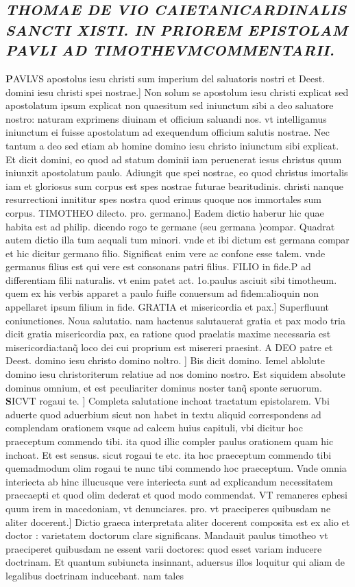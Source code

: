 \documentclass{article}
\begin{document}
\begin{pages}
\subsection*{\textit{THOMAE DE VIO CAIETANICARDINALIS SANCTI XISTI. IN PRIOREM EPISTOLAM PAVLI AD TIMOTHEVMCOMMENTARII. }}\pstart \huge\textbf{P}\normalsize AVLVS apostolus iesu christi sum imperium del saluatoris nostri et Deest. domini iesu christi spei nostrae.] Non solum se apostolum iesu christi explicat sed apostolatum ipsum explicat non quaesitum sed iniunctum sibi a deo saluatore nostro: naturam exprimens diuinam et officium saluandi nos. vt intelligamus iniunctum ei fuisse apostolatum ad exequendum officium salutis nostrae. Nec tantum a deo sed etiam ab homine domino iesu christo iniunctum sibi explicat. Et dicit domini, eo quod ad statum dominii iam peruenerat iesus christus quum iniunxit apostolatum paulo. Adiungit que  spei nostrae, eo quod christus imortalis iam et gloriosus sum corpus  est spes nostrae futurae bearitudinis. christi nanque  resurrectioni innititur spes nostra quod erimus quoque  nos immortales sum corpus. TIMOTHEO dilecto. pro. germano.] Eadem dictio haberur hic quae habita est ad philip. dicendo rogo te germane (seu germana )compar. Quadrat autem dictio illa tum aequali tum minori. vnde et ibi dictum est germana compar  et hic dicitur germano filio. Significat enim vere ac confone esse talem. vnde germanus filius est qui vere est consonans patri filius. FILIO in fide.P ad differentiam filii naturalis. vt enim patet act. 1o.paulus asciuit sibi timotheum. quem ex his verbis apparet a paulo fuifle conuersum ad fidem:alioquin non appellaret ipsum filium in fide. GRATIA et misericordia et pax.] Superfluunt coniunctiones. Noua salutatio. nam hactenus salutauerat gratia et pax  modo tria dicit gratia misericordia pax, ea ratione quod praelatis maxime necessaria est misericordia:tanq̃ loco dei cui proprium est misereri  praesint. A DEO patre et Deest. domino  iesu christo domino noltro. ] Bis dicit domino. Iemel ablolute  domino iesu christoriterum relatiue ad nos domino nostro. Est siquidem absolute dominus omnium, et est peculiariter dominus noster tanq̃ sponte seruorum.  \pend\pstart \huge\textbf{S}\normalsize ICVT rogaui te. ] Completa salutatione inchoat tractatum epistolarem. Vbi aduerte quod aduerbium sicut non habet in textu aliquid correspondens ad complendam orationem vsque  ad calcem huius capituli, vbi dicitur  hoc praeceptum commendo tibi. ita quod illic compler paulus orationem quam hic inchoat. Et est sensus. sicut rogaui te etc.  ita hoc praeceptum commendo tibi  quemadmodum olim rogaui te nunc tibi commendo hoc praeceptum. Vnde omnia interiecta ab hinc illucusque   vere interiecta sunt ad explicandum necessitatem praecaepti  et quod olim dederat et quod modo commendat. VT remaneres ephesi quum irem in macedoniam, vt denunciares. pro. vt praeciperes  quibusdam ne aliter docerent.] Dictio graeca interpretata aliter docerent composita est ex alio et doctor : varietatem doctorum clare significans. Mandauit paulus timotheo vt praeciperet quibusdam ne essent varii doctores: quod esset variam inducere doctrinam. Et quantum subiuncta insinnant, aduersus illos loquitur qui aliam de legalibus doctrinam inducebant. nam tales 
\end{pages}
\end{document}
